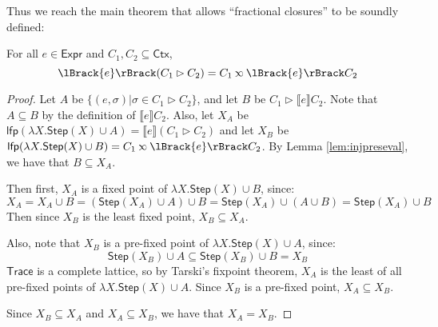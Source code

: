 \documentclass[acmsmall,screen,review]{acmart}\settopmatter{printfolios=true,printccs=false,printacmref=false}
\newcommand*{\Expr}{\mathsf{Expr}}
\newcommand*{\ctx}{\sigma}
\newcommand*{\Ctx}{\mathsf{Ctx}}
\newcommand*{\Trace}{\mathsf{Trace}}
\newcommand*{\lfp}{\mathsf{lfp}}
\newcommand*{\Step}{\mathsf{Step}}
\newcommand*{\semlink}{\mathbin{\rotatebox[origin=c]{180}{$\propto$}}}
\newcommand*{\sembracket}[1]{\lBrack{#1}\rBrack}
\begin{document}
Thus we reach the main theorem that allows ``fractional closures'' to be soundly defined:
\begin{theorem}[Advance]
  For all $e\in\Expr$ and $C_1,C_2\subseteq\Ctx$,
  \[\sembracket{e}(C_1\rhd C_2)=C_1\semlink\sembracket{e}C_2\]
\end{theorem}
\begin{proof}
  Let $A$ be $\{(e,\ctx)|\ctx\in C_1\rhd C_2\}$, and let $B$ be $C_1\rhd\sembracket{e}C_2$.
  Note that $A\subseteq B$ by the definition of $\sembracket{e}C_2$.
  Also, let $X_A$ be $\lfp(\lambda X.\Step(X)\cup A)=\sembracket{e}(C_1\rhd C_2)$ and let $X_B$ be $\lfp(\lambda X.\Step(X)\cup B)=C_1\semlink\sembracket{e}C_2$.
  By Lemma \ref{lem:injpreseval}, we have that $B\subseteq X_A$.

  Then first, $X_A$ is a fixed point of $\lambda X.\Step(X)\cup B$, since:
  \[X_A=X_A\cup B=(\Step(X_A)\cup A)\cup B=\Step(X_A)\cup(A\cup B)=\Step(X_A)\cup B\]
  Then since $X_B$ is the least fixed point, $X_B\subseteq X_A$.

  Also, note that $X_B$ is a pre-fixed point of $\lambda X.\Step(X)\cup A$, since:
  \[\Step(X_B)\cup A\subseteq\Step(X_B)\cup B=X_B\]
  $\Trace$ is a complete lattice, so by Tarski's fixpoint theorem, $X_A$ is the least of all pre-fixed points of $\lambda X.\Step(X)\cup A$.
  Since $X_B$ is a pre-fixed point, $X_A\subseteq X_B$.

  Since $X_B\subseteq X_A$ and $X_A\subseteq X_B$, we have that $X_A=X_B$.
\end{proof}
\end{document}
